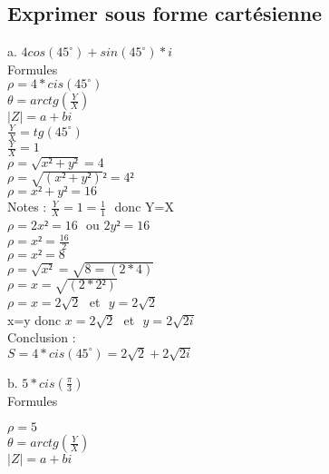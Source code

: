 \vspace{3mm} %
\subsection{Exprimer sous forme cartésienne}
\vspace{3mm} %

a. $4cos(45^{\circ}) + sin(45^{\circ}) *i$ \\

Formules \\

$\rho = 4 * cis(45^{\circ})$\\
$\theta = arctg(\frac{Y}{X})$ \\
$|Z| = a+bi $\\

\vspace{3mm} %
$\frac{Y}{X} = tg(45^{\circ})$\\
$\frac{Y}{X} = 1$\\

$\rho = \sqrt{x²+y²} = 4$\\
$\rho = \sqrt{(x²+y²)}² = 4²$\\
$\rho = x²+y² = 16$\\
Notes : $\frac{Y}{X} = 1 = \frac{1}{1}$ $ $ donc Y=X \\

$\rho = 2x² = 16$ $ $ ou $ 2y² = 16$ \\
$\rho = x² = \frac{16}{2}$ \\
$\rho = x² = 8$ \\
$\rho = \sqrt{x²} = \sqrt{8 = (2*4)}$ \\
$\rho = x = \sqrt{(2*2²)}$ \\
$\rho = x = 2\sqrt{2}$ $ $ et $ $ $ y=2\sqrt{2} $\\

x=y donc $x = 2\sqrt{2}$ $ $ et $ $ $ y=2\sqrt{2i} $ \\

Conclusion :\\

$ S= 4 * cis(45^{\circ}) = 2\sqrt{2} + 2\sqrt{2i}$

\newpage

b. $5 * cis(\frac{\pi}{3})$ \\

Formules \\
\vspace{3mm} %

$\rho = 5 $\\
$\theta = arctg(\frac{Y}{X})$ \\
$|Z| = a+bi $\\

